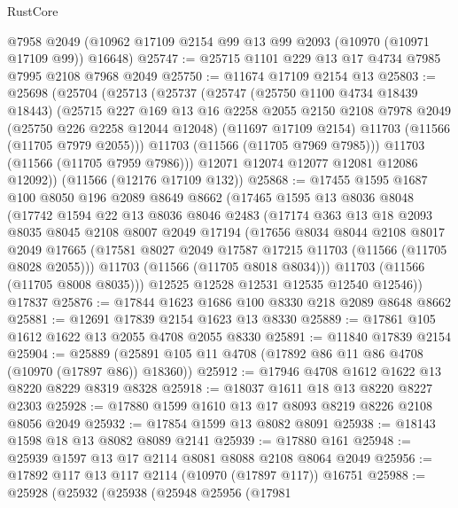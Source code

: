 \begin{lexlean}{RustCore}
\begin{coremodule}
    @7958
    @2049
    (@10962 @17109 @2154 @99 @13 @99 @2093 (@10970 (@10971 @17109 @99)) @16648)
@25747 := @25715 @1101 @229 @13 @17 @4734 @7985 @7995 @2108 @7968 @2049
@25750 := @11674 @17109 @2154 @13
@25803 := @25698
    (@25704
      (@25713
        (@25737
          (@25747
            (@25750 @1100 @4734 @18439 @18443)
            (@25715
              @227
              @169
              @13
              @16
              @2258
              @2055
              @2150
              @2108
              @7978
              @2049
              (@25750 @226 @2258 @12044 @12048)
              (@11697 @17109 @2154)
              @11703
              (@11566 (@11705 @7979 @2055)))
            @11703
            (@11566 (@11705 @7969 @7985)))
          @11703
          (@11566 (@11705 @7959 @7986)))
        @12071
        @12074
        @12077
        @12081
        @12086
        @12092))
    (@11566 (@12176 @17109 @132))
@25868 := @17455
    @1595
    @1687
    @100
    @8050
    @196
    @2089
    @8649
    @8662
    (@17465
      @1595
      @13
      @8036
      @8048
      (@17742
        @1594
        @22
        @13
        @8036
        @8046
        @2483
        (@17174
          @363
          @13
          @18
          @2093
          @8035
          @8045
          @2108
          @8007
          @2049
          @17194
          (@17656
            @8034
            @8044
            @2108
            @8017
            @2049
            @17665
            (@17581 @8027 @2049 @17587 @17215 @11703 (@11566 (@11705 @8028 @2055)))
            @11703
            (@11566 (@11705 @8018 @8034)))
          @11703
          (@11566 (@11705 @8008 @8035)))
        @12525
        @12528
        @12531
        @12535
        @12540
        @12546))
    @17837
@25876 := @17844 @1623 @1686 @100 @8330 @218 @2089 @8648 @8662
@25881 := @12691 @17839 @2154 @1623 @13 @8330
@25889 := @17861 @105 @1612 @1622 @13 @2055 @4708 @2055 @8330
@25891 := @11840 @17839 @2154
@25904 := @25889 (@25891 @105 @11 @4708 (@17892 @86 @11 @86 @4708 (@10970 (@17897 @86)) @18360))
@25912 := @17946 @4708 @1612 @1622 @13 @8220 @8229 @8319 @8328
@25918 := @18037 @1611 @18 @13 @8220 @8227 @2303
@25928 := @17880 @1599 @1610 @13 @17 @8093 @8219 @8226 @2108 @8056 @2049
@25932 := @17854 @1599 @13 @8082 @8091
@25938 := @18143 @1598 @18 @13 @8082 @8089 @2141
@25939 := @17880 @161
@25948 := @25939 @1597 @13 @17 @2114 @8081 @8088 @2108 @8064 @2049
@25956 := @17892 @117 @13 @117 @2114 (@10970 (@17897 @117)) @16751
@25988 := @25928
    (@25932
      (@25938
        (@25948
          @25956
          (@17981

\end{coremodule}
\end{lexlean}
